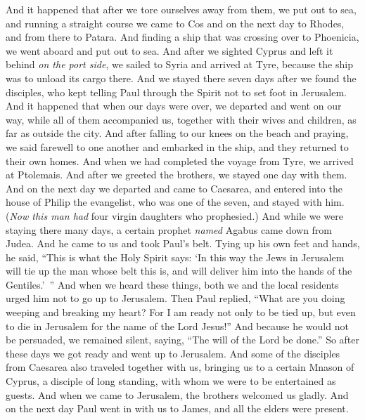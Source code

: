 \begin{biblechapter} %
 And it happened that after we tore ourselves away from them, we put out to sea, and running a straight course we came to Cos and on the next day to Rhodes, and from there to Patara.
\verse And finding a ship that was crossing over to Phoenicia, we went aboard and put out to sea.
\verse And after we sighted Cyprus and left it behind \textit{on the port side}, we sailed to Syria and arrived at Tyre, because the ship was to unload its cargo there.
\verse And we stayed there seven days after we found the disciples, who kept telling Paul through the Spirit not to set foot in Jerusalem.
\verse And it happened that when our days were over, we departed and went on our way, while all of them accompanied us, together with their wives and children, as far as outside the city. And after falling to our knees on the beach and praying,
\verse we said farewell to one another and embarked in the ship, and they returned to their own homes.
\verse And when we had completed the voyage from Tyre, we arrived at Ptolemais. And after we greeted the brothers, we stayed one day with them.
\verse And on the next day we departed and came to Caesarea, and entered into the house of Philip the evangelist, who was one of the seven, and stayed with him.
\verse (\textit{Now this man had} four virgin daughters who prophesied.)
\verse And while we were staying there many days, a certain prophet \textit{named} Agabus came down from Judea.
\verse And he came to us and took Paul’s belt. Tying up his own feet and hands, he said, “This is what the Holy Spirit says: ‘In this way the Jews in Jerusalem will tie up the man whose belt this is, and will deliver him into the hands of the Gentiles.’ ”
\verse And when we heard these things, both we and the local residents urged him not to go up to Jerusalem.
\verse Then Paul replied, “What are you doing weeping and breaking my heart? For I am ready not only to be tied up, but even to die in Jerusalem for the name of the Lord Jesus!”
\verse And because he would not be persuaded, we remained silent, saying, “The will of the Lord be done.”
\verse So after these days we got ready and went up to Jerusalem.
\verse And some of the disciples from Caesarea also traveled together with us, bringing us to a certain Mnason of Cyprus, a disciple of long standing, with whom we were to be entertained as guests.
 And when we came to Jerusalem, the brothers welcomed us gladly.
\verse And on the next day Paul went in with us to James, and all the elders were present.

\end{biblechapter}

